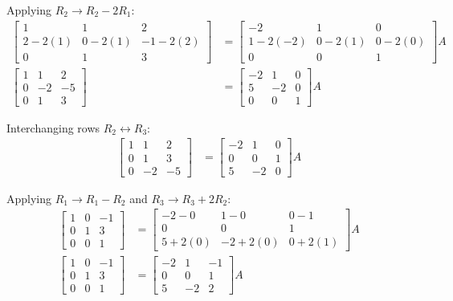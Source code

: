 \begin{enumerate}[label=\thesubsection.\arabic*, ref=\thesubsection.\theenumi]
Applying $R_2 \to R_2 - 2R_1$:
\begin{align*}
	\begin{bmatrix}
		1 & 1 & 2 \\
		2 - 2(1) & 0 - 2(1) & -1 - 2(2) \\
		0 & 1 & 3
	\end{bmatrix}
	&=
	\begin{bmatrix}
		-2 & 1 & 0 \\
		1 - 2(-2) & 0 - 2(1) & 0 - 2(0) \\
		0 & 0 & 1
	\end{bmatrix}
	A \\
	\begin{bmatrix}
		1 & 1 & 2 \\
		0 & -2 & -5 \\
		0 & 1 & 3
	\end{bmatrix}
	&=
	\begin{bmatrix}
		-2 & 1 & 0 \\
		5 & -2 & 0 \\
		0 & 0 & 1
	\end{bmatrix}
	A
\end{align*}

Interchanging rows $R_2 \leftrightarrow R_3$:
\begin{align*}
	\begin{bmatrix}
		1 & 1 & 2 \\
		0 & 1 & 3 \\
		0 & -2 & -5
	\end{bmatrix}
	&=
	\begin{bmatrix}
		-2 & 1 & 0 \\
		0 & 0 & 1 \\
		5 & -2 & 0
	\end{bmatrix}
	A
\end{align*}

Applying $R_1 \to R_1 - R_2$ and $R_3 \to R_3 + 2R_2$:
\begin{align*}
	\begin{bmatrix}
		1 & 0 & -1 \\
		0 & 1 & 3 \\
		0 & 0 & 1
	\end{bmatrix}
	&=
	\begin{bmatrix}
		-2 - 0 & 1 - 0 & 0 - 1 \\
		0 & 0 & 1 \\
		5 + 2(0) & -2 + 2(0) & 0 + 2(1)
	\end{bmatrix}
	A \\
	\begin{bmatrix}
		1 & 0 & -1 \\
		0 & 1 & 3 \\
		0 & 0 & 1
	\end{bmatrix}
	&=
	\begin{bmatrix}
		-2 & 1 & -1 \\
		0 & 0 & 1 \\
		5 & -2 & 2
	\end{bmatrix}
	A
\end{align*}


\end{enumerate}
